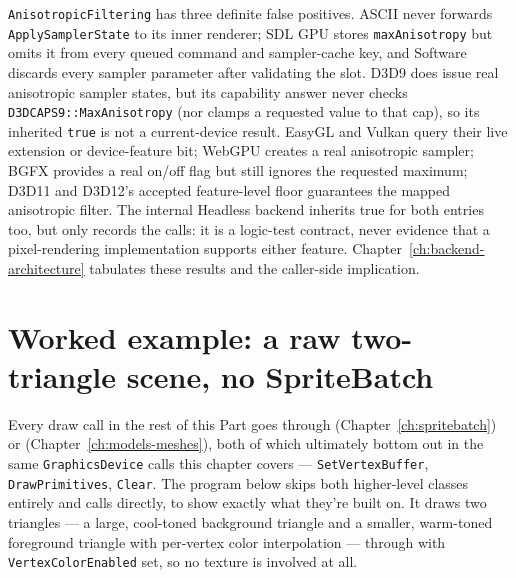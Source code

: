 \texttt{Anisotropic}\allowbreak\texttt{Filtering} has three definite false positives. ASCII
never forwards \texttt{ApplySampler}\allowbreak\texttt{State} to its inner renderer; SDL GPU stores
\texttt{maxAnisotropy} but omits it from every queued command and sampler-cache key, and
Software discards every sampler parameter after validating the slot. D3D9 does issue real
anisotropic sampler states, but its capability answer never checks
\texttt{D3DCAPS9::MaxAnisotropy} (nor clamps a requested value to that cap), so its inherited
\texttt{true} is not a current-device result. EasyGL and Vulkan query their live extension or
device-feature bit; WebGPU creates a real anisotropic sampler; BGFX provides a real on/off flag
but still ignores the requested maximum; D3D11 and D3D12's accepted feature-level floor
guarantees the mapped anisotropic filter. The internal Headless backend inherits true for both
entries too, but only records the calls: it is a logic-test contract, never evidence that a
pixel-rendering implementation supports either feature. Chapter~\ref{ch:backend-architecture}
tabulates these results and the caller-side implication.

\section{Worked example: a raw two-triangle scene, no SpriteBatch}
\label{sec:worked-drawprimitives}

Every draw call in the rest of this Part goes through 
(Chapter~\ref{ch:spritebatch}) or  (Chapter~\ref{ch:models-meshes}), both of
which ultimately bottom out in the same \texttt{GraphicsDevice} calls this chapter covers ---
\texttt{SetVertexBuffer}, \texttt{DrawPrimitives}, \texttt{Clear}. The program below skips both
higher-level classes entirely and calls  directly, to show exactly what
they're built on. It draws two triangles --- a large, cool-toned background triangle and a
smaller, warm-toned foreground triangle with per-vertex color interpolation --- through
 with \texttt{VertexColorEnabled} set, so no texture is involved at all.

